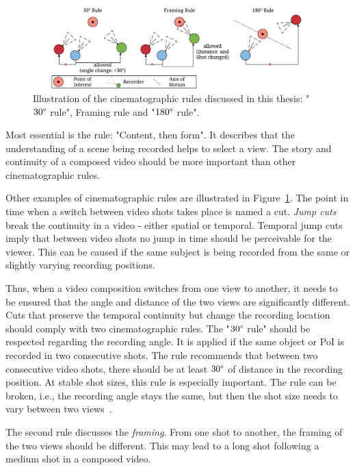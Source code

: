 \begin{figure}[tbh]
\centering
\includegraphics[width=\linewidth]{gfx/200_Background/RelatedWork_CinematographicRules}
\caption[Illustration of cinematographic rules]{Illustration of the cinematographic rules discussed in this thesis: "$30\degree$ rule", Framing rule and "$180\degree$ rule".}
\label{fig:240_relatedworkcinematographicrules}
\end{figure}

Most essential is the rule: "Content, then form".
It describes that the understanding of a scene being recorded helps to select a view.
The story and continuity of a composed video should be more important than other cinematographic rules.

Other examples of cinematographic rules are illustrated in Figure~\ref{fig:240_relatedworkcinematographicrules}.
The point in time when a switch between video shots takes place is named a cut.
\emph{Jump cuts} break the continuity in a video - either spatial or temporal.
Temporal jump cuts imply that between video shots no jump in time should be perceivable for the viewer.
This can be caused if the same subject is being recorded from the same or slightly varying recording positions.

Thus, when a video composition switches from one view to another, it needs to be ensured that the angle and distance of the two views are significantly different.
Cuts that preserve the temporal continuity but change the recording location should comply with two cinematographic rules.
The "$30\degree$ rule" should be respected regarding the recording angle.
It is applied if the same object or \ac{PoI} is recorded in two consecutive shots.
The rule recommends that between two consecutive video shots, there should be at least $30\degree$ of distance in the recording position.
At stable shot sizes, this rule is especially important.
The rule can be broken, i.e., the recording angle stays the same, but then the shot size needs to vary between two views~\cite{Proferes2005}.

The second rule discusses the \emph{framing}. From one shot to another, the framing of the two views should be different.
This may lead to a long shot following a medium shot in a composed video.

